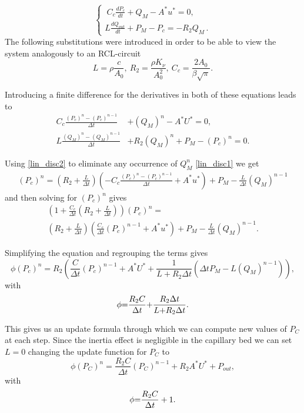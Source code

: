 \documentclass[a4paper, oneside]{discothesis}
\begin{document}
\begin{equation}
	\left\{\begin{array}{l}
			\ C_c\frac{d P_{c}}{d t}+Q_{M}-A^*u^*=0,\\
			{L}{\frac{d Q_{out}}{d t}}+P_{M}-P_{c}=-R_2 Q_{M}\,.
	\end{array}\right.
\end{equation}
The following substitutions were introduced in order to be able to view the system analogously to an RCL-circuit
\begin{equation}
	L = \rho \frac{c}{A_0}, \  
	R_2 = \frac{\rho K_\nu}{A_0^2}, \ 
	C_c =\frac{2A_0}{\beta\sqrt{\pi}}. 
\end{equation}

Introducing a finite difference for the derivatives in both of these equations leads to
\begin{align}
	C_c{\frac{(P_{c})^{n}-(P_{c})^{n-1}}{\Delta t}} &+ (Q_M)^{n}-A^{*}U^{*} = 0, \label{lin_disc1}\\ 
	L\frac{(Q_M)^{n}-(Q_M)^{n-1}}{\Delta t} &+ R_{2}(Q_M)^{n}+P_M-(P_{c})^{n} = 0. \label{lin_disc2}
\end{align}

Using \ref{lin_disc2} to eliminate any occurrence of $Q_M^n$ \ref{lin_disc1} we get
\begin{align}
	(P_c)^n = \left(R_2 + \frac{L}{\Delta t}\right) \left( - C_c \frac{(P_c)^n - (P_c)^{n-1}}{\Delta t} + A^*u^*\right)+ P_M - \frac{L}{\Delta t} (Q_M)^{n-1}
\end{align}
and then solving for $(P_c)^n$ gives
\begin{multline}
	\left( 1+ \frac{C_c}{\Delta t}\left( R_2 + \frac{L}{\Delta t} \right) \right) (P_c)^n = \\
	\left( R_2 + \frac{L}{\Delta t} \right) \left( \frac{C_c}{\Delta t} (P_c)^{n-1} + A^*u^* \right) + P_M - \frac{L}{\Delta t} (Q_M)^{n-1}.
\end{multline}

Simplifying the equation and regrouping the terms gives
\begin{equation}
	\phi(P_{c})^{n}=R_2 \left( \frac{C}{\Delta t}(P_{c})^{n-1} + A^{*}U^{*}+\frac{1}{L+R_{2}\Delta t}\left(\Delta t P_M-L(Q_M)^{n-1}\right) \right),
\end{equation}
with 
\begin{equation}
	\phi{\cal=}\frac{R_{2}C}{\Delta t}{\bf+}\frac{R_{2}\Delta t}{L{+}R_{2}\Delta t}. \label{RCL}
\end{equation}

This gives us an update formula through which we can compute new values of $P_C$ at each step.
Since the inertia effect is negligible in the capillary bed we can set $L=0$ changing the update function for $P_C$ to 
\begin{equation}
	\phi(P_{C})^{n}=\frac{R_{2}C}{\Delta t}(P_{C})^{n-1}+R_{2}A^{*}U^{*}+P_{out},
\end{equation}
with 
\begin{equation}
	\phi{\cal=}\frac{R_{2}C}{\Delta t} + 1. 
\end{equation}
\end{document}
